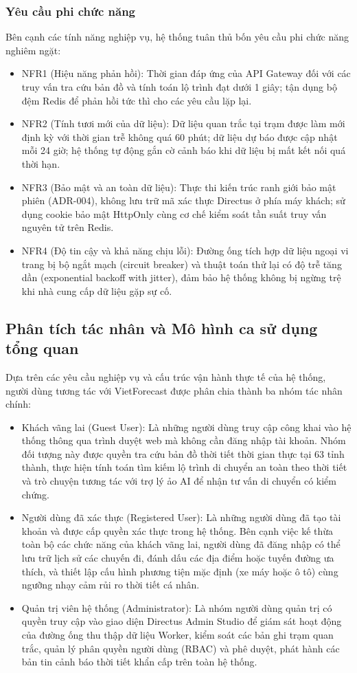 \subsubsection{Yêu cầu phi chức năng}
Bên cạnh các tính năng nghiệp vụ, hệ thống tuân thủ bốn yêu cầu phi chức năng nghiêm ngặt:
\begin{itemize}
    \item NFR1 (Hiệu năng phản hồi): Thời gian đáp ứng của API Gateway đối với các truy vấn tra cứu bản đồ và tính toán lộ trình đạt dưới 1 giây; tận dụng bộ đệm Redis để phản hồi tức thì cho các yêu cầu lặp lại.
    \item NFR2 (Tính tươi mới của dữ liệu): Dữ liệu quan trắc tại trạm được làm mới định kỳ với thời gian trễ không quá 60 phút; dữ liệu dự báo được cập nhật mỗi 24 giờ; hệ thống tự động gắn cờ cảnh báo khi dữ liệu bị mất kết nối quá thời hạn.
    \item NFR3 (Bảo mật và an toàn dữ liệu): Thực thi kiến trúc ranh giới bảo mật phiên (ADR-004), không lưu trữ mã xác thực Directus ở phía máy khách; sử dụng cookie bảo mật HttpOnly cùng cơ chế kiểm soát tần suất truy vấn nguyên tử trên Redis.
    \item NFR4 (Độ tin cậy và khả năng chịu lỗi): Đường ống tích hợp dữ liệu ngoại vi trang bị bộ ngắt mạch (circuit breaker) và thuật toán thử lại có độ trễ tăng dần (exponential backoff with jitter), đảm bảo hệ thống không bị ngừng trệ khi nhà cung cấp dữ liệu gặp sự cố.
\end{itemize}

\subsection{Phân tích tác nhân và Mô hình ca sử dụng tổng quan}
Dựa trên các yêu cầu nghiệp vụ và cấu trúc vận hành thực tế của hệ thống, người dùng tương tác với VietForecast được phân chia thành ba nhóm tác nhân chính:
\begin{itemize}
    \item Khách vãng lai (Guest User): Là những người dùng truy cập công khai vào hệ thống thông qua trình duyệt web mà không cần đăng nhập tài khoản. Nhóm đối tượng này được quyền tra cứu bản đồ thời tiết thời gian thực tại 63 tỉnh thành, thực hiện tính toán tìm kiếm lộ trình di chuyển an toàn theo thời tiết và trò chuyện tương tác với trợ lý ảo AI để nhận tư vấn di chuyển có kiểm chứng.
    \item Người dùng đã xác thực (Registered User): Là những người dùng đã tạo tài khoản và được cấp quyền xác thực trong hệ thống. Bên cạnh việc kế thừa toàn bộ các chức năng của khách vãng lai, người dùng đã đăng nhập có thể lưu trữ lịch sử các chuyến đi, đánh dấu các địa điểm hoặc tuyến đường ưa thích, và thiết lập cấu hình phương tiện mặc định (xe máy hoặc ô tô) cùng ngưỡng nhạy cảm rủi ro thời tiết cá nhân.
    \item Quản trị viên hệ thống (Administrator): Là nhóm người dùng quản trị có quyền truy cập vào giao diện Directus Admin Studio để giám sát hoạt động của đường ống thu thập dữ liệu Worker, kiểm soát các bản ghi trạm quan trắc, quản lý phân quyền người dùng (RBAC) và phê duyệt, phát hành các bản tin cảnh báo thời tiết khẩn cấp trên toàn hệ thống.
\end{itemize}

